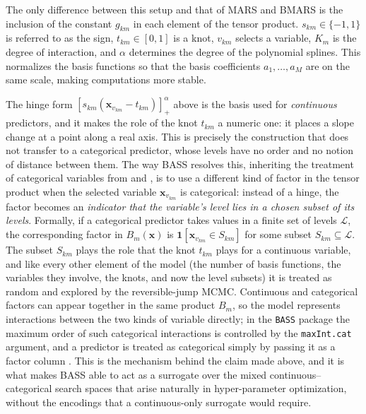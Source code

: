 
The only difference between this setup and that of MARS and BMARS is the inclusion of the constant $g_{km}$ in each element of the tensor product.   $s_{km} \in \{-1,1\}$ is referred to as the sign, $t_{km}\in [0,1]$ is a knot, $v_{km}$ selects a variable, $K_m$ is the degree of interaction, and $\alpha$ determines the degree of the polynomial splines. This normalizes the basis functions so that the basis coefficients $a_1, \ldots, a_M$ are on the same scale, making computations more stable.

The hinge form $[s_{km}(\boldsymbol{x}_{v_{km}} - t_{km})]^\alpha_+$ above is the basis used for \emph{continuous} predictors, and it makes the role of the knot $t_{km}$ a numeric one: it places a slope change at a point along a real axis. This is precisely the construction that does not transfer to a categorical predictor, whose levels have no order and no notion of distance between them. The way BASS resolves this, inheriting the treatment of categorical variables from \cite{friedman1991multivariate} and \cite{denison1998bayesian}, is to use a different kind of factor in the tensor product when the selected variable $\boldsymbol{x}_{v_{km}}$ is categorical: instead of a hinge, the factor becomes an \emph{indicator that the variable's level lies in a chosen subset of its levels}. Formally, if a categorical predictor takes values in a finite set of levels $\mathcal{L}$, the corresponding factor in $B_m(\boldsymbol{x})$ is $\boldsymbol{1}\!\left[\boldsymbol{x}_{v_{km}} \in S_{km}\right]$ for some subset $S_{km} \subseteq \mathcal{L}$. The subset $S_{km}$ plays the role that the knot $t_{km}$ plays for a continuous variable, and like every other element of the model (the number of basis functions, the variables they involve, the knots, and now the level subsets) it is treated as random and explored by the reversible-jump MCMC. Continuous and categorical factors can appear together in the same product $B_m$, so the model represents interactions between the two kinds of variable directly; in the \texttt{BASS} package the maximum order of such categorical interactions is controlled by the \texttt{maxInt.cat} argument, and a predictor is treated as categorical simply by passing it as a factor column \cite{francom2020bass}. This is the mechanism behind the claim made above, and it is what makes BASS able to act as a surrogate over the mixed continuous--categorical search spaces that arise naturally in hyper-parameter optimization, without the encodings that a continuous-only surrogate would require.

